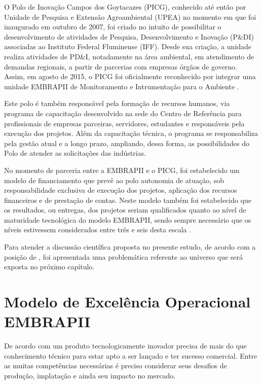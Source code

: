   O Polo de Inovação Campos dos Goytacazes (PICG), conhecido até então por Unidade de Pesquisa e Extensão Agroambiental (UPEA) no momento em que foi inaugurado em outubro de 2007, foi criado no intuito de possibilitar o desenvolvimento de atividades de Pesquisa, Desenvolvimento e Inovação (P\&DI) associadas ao Instituto Federal Fluminense (IFF). Desde sua criação, a unidade realiza atividades de PD\&I, notadamente na área ambiental, em atendimento de demandas regionais, a partir de parcerias com empresas  órgãos de governo. Assim, em agosto de 2015, o PICG foi oficialmente reconhecido por integrar uma unidade EMBRAPII de Monitoramento e Intrumentação para o Ambiente \cite{embrapiiff}.

  Este polo é também responsável pela formação de recursos humanos, via programa de capacitação desenvolvido na sede do Centro de Referência para profissionais de empresas parceiras, servidores, estudantes e responsáveis pela execução dos projetos. Além da capacitação técnica, o programa se responsabiliza pela gestão atual e a longo prazo, ampliando, dessa forma, as possibilidades do Polo de atender as solicitações das indústrias.

  No momento de parceria entre a EMBRAPII e o PICG, foi estabelecido um modelo de financiamento que prevê ao polo autonomia de atuação, sob responsabilidade exclusiva de execução dos projetos, aplicação dos recursos financeiros e de prestação de contas. Neste modelo também foi estabelecido que os resultados, ou entregas, dos projetos seriam qualificados quanto ao nível de maturidade tecnológica do modelo EMBRAPII, sendo sempre necessário que os níveis estivessem considerados entre três e seis desta escala \cite{iffembrapii2016}.

  Para atender a discussão científica proposta no presente estudo, de acordo com a posição de , foi apresentada uma problemática referente ao universo que será exposta no próximo capítulo.


\section{Modelo de Excelência Operacional EMBRAPII}

  De acordo com  um produto tecnologicamente inovador precisa de mais do que conhecimento técnico para estar apto a ser lançado e ter sucesso comercial. Entre as muitas competências necessárias é preciso considerar seus desafios de produção, implatação e ainda seu impacto no mercado.


